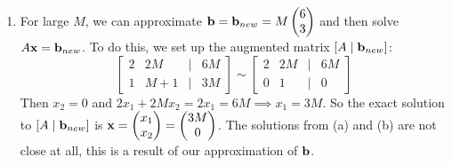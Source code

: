 \documentclass[11pt]{article}
\begin{document}
\begin{exercise}{2}
{\begin{enumerate}[label=(\alph*)]
            \item For large $M$, we can approximate $\textbf{b} = \textbf{b} _{new} = M \begin{pmatrix} 6 \\ 3 \end{pmatrix}$ and then solve $A \textbf{x} = \textbf{b} _{new}$.
            To do this, we set up the augmented matrix $ [A \mid \textbf{b} _{new}] $:
            $$ \begin{bmatrix}
                2 & 2M &  \mid & 6M \\
                1 & M+1 & \mid & 3M
            \end{bmatrix}
            \sim
            \begin{bmatrix}
                2 & 2M & \mid & 6M \\
                0 & 1  & \mid & 0
            \end{bmatrix} $$
            Then $x_2 = 0$ and $2x_1 + 2Mx_2 = 2x_1 = 6M \implies x_1 = 3M$.
            So the exact solution to $[A \mid \textbf{b} _{new}]$ is $\textbf{x} = \begin{pmatrix} x_1 \\ x_2 \end{pmatrix} = \begin{pmatrix} 3M \\ 0 \end{pmatrix}$. \parspace
            The solutions from (a) and (b) are not close at all, this is a result of our approximation of $\textbf{b}$.
        \end{enumerate}
    }
\end{exercise}

\end{document}
